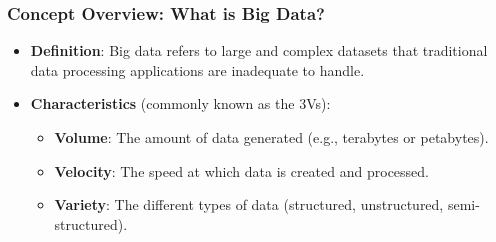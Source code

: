 \documentclass[aspectratio=169]{beamer}
\begin{document}
\begin{frame}[fragile]
    \frametitle{Concept Overview: What is Big Data?}
    \begin{itemize}
        \item \textbf{Definition}: Big data refers to large and complex datasets that traditional data processing applications are inadequate to handle.
        \item \textbf{Characteristics} (commonly known as the 3Vs):
        \begin{itemize}
            \item \textbf{Volume}: The amount of data generated (e.g., terabytes or petabytes).
            \item \textbf{Velocity}: The speed at which data is created and processed.
            \item \textbf{Variety}: The different types of data (structured, unstructured, semi-structured).
        \end{itemize}
    \end{itemize}
\end{frame}
\end{document}
